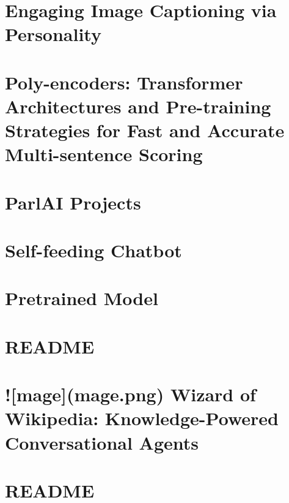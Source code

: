 \documentclass[twoside]{book}
\newcommand{\+}{\discretionary{\mbox{\scriptsize$\hookleftarrow$}}{}{}}
\begin{document}
\chapter{Engaging Image Captioning via Personality}
\label{md_projects_personality_captions_README}

\chapter{Poly-\/encoders\+: Transformer Architectures and Pre-\/training Strategies for Fast and Accurate Multi-\/sentence Scoring}
\label{md_projects_polyencoder_README}

\chapter{Parl\+AI Projects}
\label{md_projects_README}

\chapter{Self-\/feeding Chatbot}
\label{md_projects_self_feeding_README}

\chapter{Pretrained Model}
\label{md_projects_twitter_seq2seq_README}

\chapter{R\+E\+A\+D\+ME}
\label{md_projects_wizard_of_wikipedia_mturk_evaluation_task_README}

\chapter{!\mbox{[}mage\mbox{]}(mage.\+png) Wizard of Wikipedia\+: Knowledge-\/\+Powered Conversational Agents}
\label{md_projects_wizard_of_wikipedia_README}

\chapter{R\+E\+A\+D\+ME}
\label{md_README}

\end{document}

